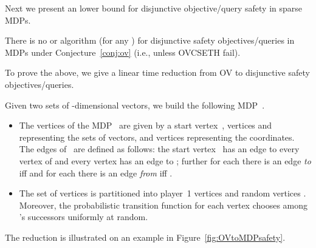 \documentclass[11pt,letterpaper]{article}
\newcommand{\lu}{\textup{(}}
\newcommand{\ru}{\textup{)}\xspace}
\newcommand{\upbr}[1]{\lu #1\ru}
\newif\iffullversion
\newcommand{\infull}[1]{\iffullversion #1\fi}
\newcommand{\inshort}[1]{\iffullversion \else #1\fi}
\begin{document}
Next we present an  lower bound for disjunctive objective/query safety in sparse MDPs.

\begin{theorem}\label{thm:safety_OVChard}
  There is no  or  algorithm \upbr{for any } for disjunctive safety objectives/queries in MDPs under Conjecture~\ref{conj:ov} \upbr{i.e., unless
  OVC\infull{ and }\inshort{ \& }SETH fail}.
  \infull{In particular, there is no such algorithm for deciding whether the winning set is non-empty
  or deciding whether a specific vertex is in the winning set.}
\end{theorem}

To prove the above, we give a linear time reduction from OV to disjunctive safety objectives/queries.

\begin{reduction}\label{red:OVtoMDPsafety}
 Given two sets  of -dimensional vectors, we build the following MDP~.  
 \begin{itemize}
  \item   The vertices  of the MDP~
  are given by a start vertex~, vertices  and  representing the 
  sets of vectors, and 
  vertices  representing the 
  coordinates. The edges  of~ are defined as follows: the start vertex~
  has an edge to every vertex of  and every vertex  has an edge to ;
  further for each 
  there is an edge \emph{to}  iff  and for each 
  there is an edge \emph{from}  iff .
  \item The set of vertices  is partitioned into player~1 vertices 
	and random vertices .
	Moreover, the probabilistic transition function for each vertex  chooses among 's successors
	uniformly at random.	
 \end{itemize}
\end{reduction}
The reduction is illustrated on an example in Figure~\ref{fig:OVtoMDPsafety}. 
\end{document}

